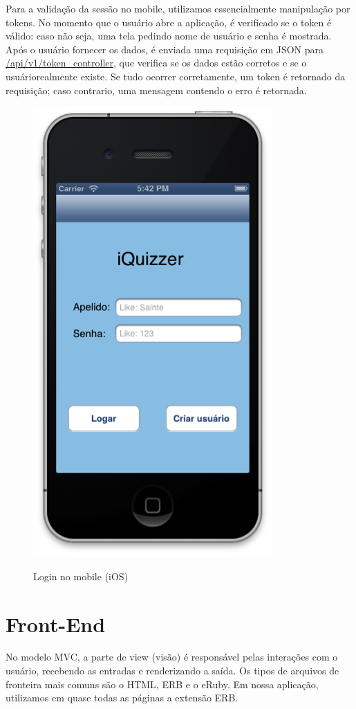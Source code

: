    Para a validação da sessão no mobile, utilizamos essencialmente manipulação por tokens. No momento que o usuário abre a aplicação, é verificado se o token é válido: caso não seja, uma tela pedindo nome de usuário e senha é mostrada. Após o usuário fornecer os dados, é enviada uma requisição em \ac{JSON} para \url{/api/v1/token_controller}, que verifica se os dados estão corretos e se o usuáriorealmente existe. Se tudo ocorrer corretamente, um token é retornado da requisição; caso contrario, uma mensagem contendo o erro é retornada.
	 \begin{figure}[H]
	   \centering
	   \includegraphics{figs/ioslogin.png}\\
	   \caption{ Login no mobile (iOS) }
	   \label{FIG:iOSlogin}
	 \end{figure}

    \section{Front-End}
            No modelo \ac{MVC}, a parte de view (visão) é responsável pelas interações com o usuário, recebendo as entradas e renderizando a saída. Os tipos de arquivos de fronteira mais comuns são o \ac{HTML}, ERB e o eRuby. Em nossa aplicação, utilizamos em quase todas as páginas a extensão ERB.
			
